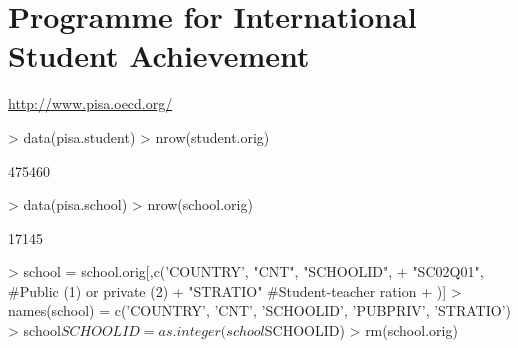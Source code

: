 \documentclass[nojss]{jss}
\begin{document}
\section{Programme for International Student Achievement}

\url{http://www.pisa.oecd.org/}

\begin{Schunk}
\begin{Sinput}
> data(pisa.student)
> nrow(student.orig)
\end{Sinput}
\begin{Soutput}
[1] 475460
\end{Soutput}
\begin{Sinput}
> data(pisa.school)
> nrow(school.orig)
\end{Sinput}
\begin{Soutput}
[1] 17145
\end{Soutput}
\end{Schunk}


\begin{Schunk}
\begin{Sinput}
> school = school.orig[,c('COUNTRY', "CNT", "SCHOOLID",
+ 	"SC02Q01", #Public (1) or private (2)
+ 	"STRATIO" #Student-teacher ration    
+ )]
> names(school) = c('COUNTRY', 'CNT', 'SCHOOLID', 'PUBPRIV', 'STRATIO')
> school$SCHOOLID = as.integer(school$SCHOOLID)
> rm(school.orig)
\end{Sinput}
\end{Schunk}
\end{document}
